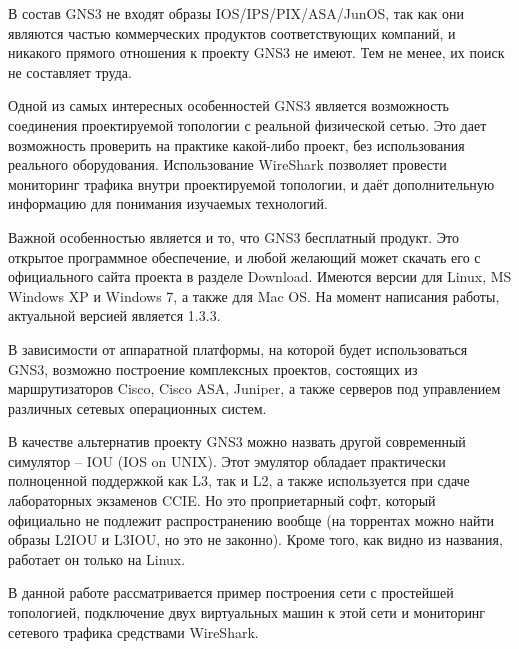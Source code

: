 В состав GNS3 не входят образы IOS/IPS/PIX/ASA/JunOS, так как они являются частью коммерческих продуктов соответствующих компаний, и никакого прямого отношения к проекту GNS3 не имеют. Тем не менее, их поиск не составляет труда.

Одной из самых интересных особенностей GNS3 является возможность соединения проектируемой топологии с реальной физической сетью. Это дает возможность проверить на практике какой-либо проект, без использования реального оборудования. Использование WireShark позволяет провести мониторинг трафика внутри проектируемой топологии, и даёт дополнительную информацию для понимания изучаемых технологий.

Важной особенностью является и то, что GNS3 бесплатный продукт. Это открытое программное обеспечение, и любой желающий может скачать его с официального сайта проекта в разделе Download. Имеются версии для Linux, MS Windows XP и Windows 7, а также для Mac OS. На момент написания работы, актуальной версией является 1.3.3.

В зависимости от аппаратной платформы, на которой будет использоваться GNS3, возможно построение комплексных проектов, состоящих из маршрутизаторов Cisco, Cisco ASA, Juniper, а также серверов под управлением различных сетевых операционных систем.

В качестве альтернатив проекту GNS3 можно назвать другой современный симулятор -- IOU (IOS on UNIX). Этот эмулятор обладает практически полноценной поддержкой как L3, так и L2, а также используется при сдаче лабораторных экзаменов CCIE. Но это проприетарный софт, который официально не подлежит распространению вообще (на торрентах можно найти образы L2IOU и L3IOU, но это не законно). Кроме того, как видно из названия, работает он только на Linux.

В данной работе рассматривается пример построения сети с простейшей топологией, подключение двух виртуальных машин к этой сети и мониторинг сетевого трафика средствами WireShark.
